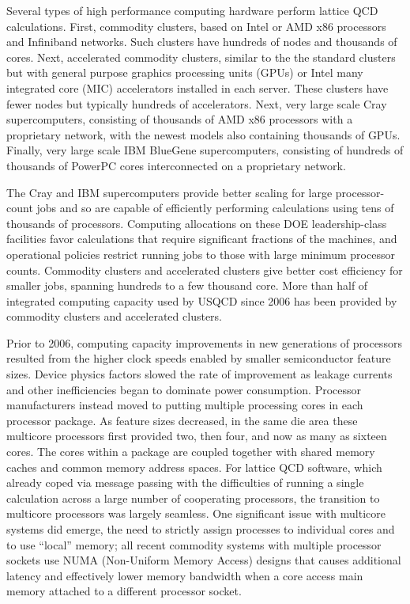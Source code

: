 Several types of high performance computing hardware perform lattice QCD
calculations.  First, commodity clusters, based on Intel or AMD x86 processors
and Infiniband networks.  Such clusters have hundreds of nodes and thousands
of cores.  Next, accelerated commodity clusters, similar to the the standard
clusters but with general purpose graphics processing units (GPUs) or Intel
many integrated core (MIC) accelerators installed in each server.  These
clusters have fewer nodes but typically hundreds of accelerators.  Next, very
large scale Cray supercomputers, consisting of thousands of AMD x86 processors
with a proprietary network, with the newest models also containing thousands
of GPUs.  Finally, very large scale IBM BlueGene supercomputers, consisting
of hundreds of thousands of PowerPC cores interconnected on a proprietary
network.

The Cray and IBM supercomputers provide better scaling for large
processor-count jobs and so are capable of efficiently performing calculations
using tens of thousands of processors.  Computing allocations on these DOE
leadership-class facilities favor calculations that require significant
fractions of the machines, and operational policies restrict running jobs to
those with large minimum processor counts.  Commodity clusters and accelerated
clusters give better cost efficiency for smaller jobs, spanning hundreds to a
few thousand core.
More than half of integrated computing capacity used by USQCD
since 2006 has been provided by commodity clusters and accelerated clusters.

Prior to 2006, computing capacity improvements in new generations of
processors resulted from the higher clock speeds enabled by smaller
semiconductor feature sizes.  Device physics factors slowed the rate of
improvement as leakage currents and other inefficiencies began to dominate
power consumption.  Processor manufacturers instead moved to putting multiple
processing cores in each processor package.  As feature sizes decreased, in
the same die area these multicore processors first provided two, then four,
and now as many as sixteen cores.  The cores within a package are coupled
together with shared memory caches and common memory address spaces.  For lattice QCD
software, which already coped via message passing with the difficulties of
running a single calculation across a large number of cooperating processors,
the transition to multicore processors was largely seamless.  One significant
issue with multicore systems did emerge, the need to strictly assign processes
to individual cores and to use ``local'' memory; all recent commodity systems
with multiple processor sockets use NUMA (Non-Uniform Memory Access) designs
that causes additional latency and effectively lower memory bandwidth when a
core access main memory attached to a different processor socket.   

